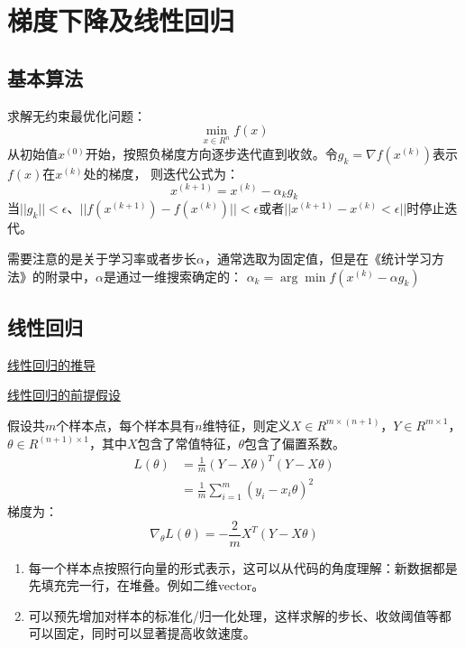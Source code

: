 \section{梯度下降及线性回归}
\subsection{基本算法}
求解无约束最优化问题：
\begin{equation*}
    \min_{x \in R^n} f(x)
\end{equation*}
从初始值$x^{(0)}$开始，按照负梯度方向逐步迭代直到收敛。令$g_k = \nabla f(x^{(k)})$表示$f(x)$在$x^{(k)}$处的梯度，
则迭代公式为：
\begin{equation*}
    x^{(k+1)} = x^{(k)} - \alpha_k g_k
\end{equation*}
当$||g_k|| < \epsilon$、$||f(x^{(k+1)}) - f(x^{(k)})|| < \epsilon$或者$||x^{(k+1)} - x^{(k)} < \epsilon||$时停止迭代。

需要注意的是关于学习率或者步长$\alpha$，通常选取为固定值，但是在《统计学习方法》的附录中，$\alpha$是通过一维搜索确定的：
$\alpha_k = \arg \min f(x^{(k)} - \alpha g_k)$

\subsection{线性回归}
\href{http://sofasofa.io/forum_main_post.php?postid=1002489}{线性回归的推导}

\href{http://sofasofa.io/forum_main_post.php?postid=1000313}{线性回归的前提假设}


假设共$m$个样本点，每个样本具有$n$维特征，则定义$X \in R^{m \times (n+1)}$，$Y \in R^{m\times 1}$，
$\theta \in R^{(n+1)\times 1}$，其中$X$包含了常值特征，$\theta$包含了偏置系数。
\begin{align*}
    L(\theta) &= \frac{1}{m} (Y-X\theta)^T (Y-X\theta) \\
    &= \frac{1}{m} \sum_{i=1}^m (y_i - x_i \theta)^2
\end{align*}
梯度为：
\begin{equation*}
    \nabla_\theta L(\theta) = -\frac{2}{m} X^T (Y-X\theta)
\end{equation*}

{}
\begin{enumerate}
\item 每一个样本点按照行向量的形式表示，这可以从代码的角度理解：新数据都是先填充完一行，在堆叠。例如二维vector。
\item 可以预先增加对样本的标准化/归一化处理，这样求解的步长、收敛阈值等都可以固定，同时可以显著提高收敛速度。
\end{enumerate}


